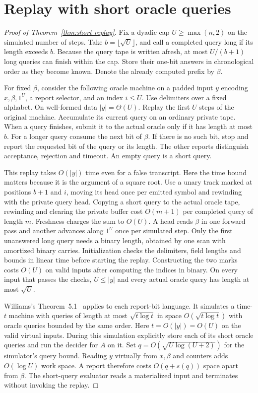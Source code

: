 \documentclass[11pt]{article}
\theoremstyle{remark}
\begin{document}
\section{Replay with short oracle queries}\label{sec:short-replay}
\begin{proof}[Proof of Theorem~\ref{thm:short-replay}]
Fix a dyadic cap $U\ge\max(n,2)$ on the simulated number of steps.
Take $b=\lfloor\sqrt U\rfloor$, and call a completed query long if its
length exceeds $b$. Because the query tape is written afresh, at most
$U/(b+1)$ long queries can finish within the cap. Store their one-bit
answers in chronological order as they become known. Denote the
already computed prefix by $\beta$.

For fixed $\beta$, consider the following oracle machine on a padded
input $y$ encoding $x,\beta,1^U$, a report selector, and an index
$i\le U$. Use delimiters over a fixed alphabet. On well-formed data
$|y|=\Theta(U)$. Replay the first $U$ steps of the original machine.
Accumulate its current query on an ordinary private tape. When a
query finishes, submit it to the actual oracle only if it has length
at most $b$. For a longer query consume the next bit of $\beta$.
If there is no such bit, stop and report the requested bit of the
query or its length. The other reports distinguish acceptance,
rejection and timeout. An empty query is a short query.

This replay takes $O(|y|)$ time even for a false transcript. Here the
time bound matters because it is the argument of a square root.
Use a unary track marked at positions $b+1$ and $i$, moving its head
once per emitted symbol and rewinding with the private query head.
Copying a short query to the actual oracle tape, rewinding and clearing
the private buffer cost $O(m+1)$ per completed query of length $m$.
Freshness charges the sum to $O(U)$. A head reads $\beta$ in one
forward pass and another advances along $1^U$ once per simulated step.
Only the first unanswered long query needs a binary length, obtained
by one scan with amortized binary carries. Initialization checks the
delimiters, field lengths and bounds in linear time before starting
the replay. Constructing the two marks costs $O(U)$ on valid inputs
after computing the indices in binary. On every input that passes
the checks, $U\le |y|$ and every actual oracle query has length at
most $\sqrt U$.

Williams's Theorem~5.1~\cite{Wil25} applies to each report-bit
language. It simulates a time-$t$ machine with queries of length at
most $\sqrt{t\log t}$ in space $O(\sqrt{t\log t})$ with oracle
queries bounded by the same order. Here $t=O(|y|)=O(U)$ on the valid
virtual inputs. During this simulation explicitly store each of its
short oracle queries and run the decider for $A$ on it. Set
$q=O(\sqrt{U\log(U+2)})$ for the simulator's query bound. Reading
$y$ virtually from $x,\beta$ and counters adds $O(\log U)$ work
space. A report therefore costs $O(q+s(q))$ space apart from $\beta$.
The short-query evaluator reads a materialized input and terminates
without invoking the replay.


\end{proof}
\end{document}
